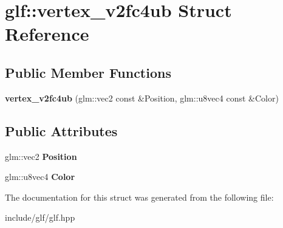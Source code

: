 \hypertarget{structglf_1_1vertex__v2fc4ub}{\section{glf\-:\-:vertex\-\_\-v2fc4ub \-Struct \-Reference}
\label{structglf_1_1vertex__v2fc4ub}
}
\subsection*{\-Public \-Member \-Functions}
\begin{DoxyCompactItemize}
\item 
\hypertarget{structglf_1_1vertex__v2fc4ub_a52455f592976ac3276ceefc33badc8cc}{{\bfseries vertex\-\_\-v2fc4ub} (glm\-::vec2 const \&\-Position, glm\-::u8vec4 const \&\-Color)}\label{structglf_1_1vertex__v2fc4ub_a52455f592976ac3276ceefc33badc8cc}

\end{DoxyCompactItemize}
\subsection*{\-Public \-Attributes}
\begin{DoxyCompactItemize}
\item 
\hypertarget{structglf_1_1vertex__v2fc4ub_ac99016a21c7f4a2e1af3d5d2107d1d50}{glm\-::vec2 {\bfseries \-Position}}\label{structglf_1_1vertex__v2fc4ub_ac99016a21c7f4a2e1af3d5d2107d1d50}

\item 
\hypertarget{structglf_1_1vertex__v2fc4ub_a7a0acf0a6e02a74891d6ab5d6bc80e4d}{glm\-::u8vec4 {\bfseries \-Color}}\label{structglf_1_1vertex__v2fc4ub_a7a0acf0a6e02a74891d6ab5d6bc80e4d}

\end{DoxyCompactItemize}


\-The documentation for this struct was generated from the following file\-:\begin{DoxyCompactItemize}
\item 
include/glf/glf.\-hpp\end{DoxyCompactItemize}
